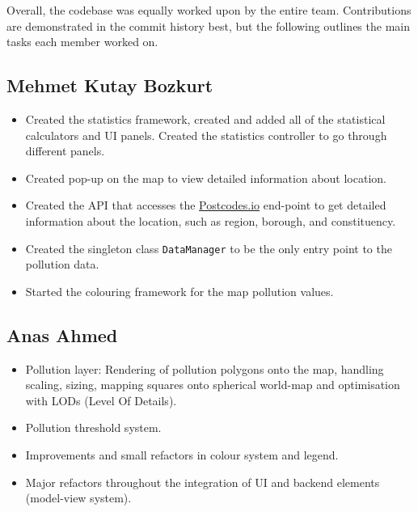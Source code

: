 \documentclass[10pt, a4paper]{scrartcl}
\begin{document}
\begin{multicols}{2}
\noindent Overall, the codebase was equally worked upon by the entire team. Contributions are demonstrated in the
commit history best, but the following outlines the main tasks each member worked on.

\subsection{Mehmet Kutay Bozkurt}

\vspace{-0.2em}

\begin{itemize}
    \itemsep-0.3em 
    \item Created the statistics framework, created and added all of the statistical calculators and UI panels. Created the
    statistics controller to go through different panels.
    \item Created pop-up on the map to view detailed information about location.
    \item Created the API that accesses the \href{https://postcodes.io/}{Postcodes.io} end-point to get detailed information
    about the location, such as region, borough, and constituency.
    \item Created the singleton class \verb|DataManager| to be the only entry point to the pollution data.
    \item Started the colouring framework for the map pollution values.
\end{itemize}

\vspace{-0.2em}

\subsection{Anas Ahmed}

\vspace{-0.2em}

\begin{itemize}
    \itemsep-0.3em 
    \item Pollution layer: Rendering of pollution polygons onto the map, handling scaling, sizing, mapping squares onto spherical
    world-map and optimisation with LODs (Level Of Details).
    \item Pollution threshold system.
    \item Improvements and small refactors in colour system and legend.
    \item Major refactors throughout the integration of UI and backend elements (model-view system).
\end{itemize}


\end{multicols}
\end{document}
